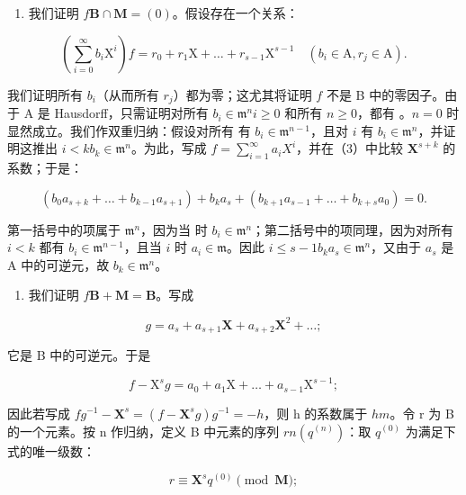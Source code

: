\begin{enumerate}
\def\labelenumi{(\alph{enumi})}
\tightlist
\item
  我们证明 \(f\mathbf{B} \cap \mathbf{M} = (0)\)。假设存在一个关系：
\end{enumerate}

\[
\left(\sum_ {i = 0} ^ {\infty} b _ {i} \mathrm{X} ^ {i}\right) f = r _ {0} + r _ {1} \mathrm{X} + \dots + r _ {s - 1} \mathrm{X} ^ {s - 1} \quad (b _ {i} \in \mathrm{A}, r _ {j} \in \mathrm{A}).\tag{3}
\]

我们证明所有 \(b_{i}\)（从而所有 \(r_{j}\)）都为零；这尤其将证明 \(f\) 不是 B 中的零因子。由于 A 是 Hausdorff，只需证明对所有 \(b_{i} \in \mathfrak{m}^{n}\)\(i \geqslant 0\) 和所有 \(n \geqslant 0\)，都有 。\(n = 0\) 时显然成立。我们作双重归纳：假设对所有  有 \(b_{i} \in \mathfrak{m}^{n-1}\)，且对 \(i\) 有 \(b_{i} \in \mathfrak{m}^{n}\)，并证明这推出 \(i < k\)\(b_{k} \in \mathfrak{m}^{n}\)。为此，写成 \(f = \sum_{i=1}^{\infty} a_{i} X^{i}\)，并在（3）中比较 \(\mathbf{X}^{s+k}\) 的系数；于是：

\[
\left(b _ {0} a _ {s + k} + \dots + b _ {k - 1} a _ {s + 1}\right) + b _ {k} a _ {s} + \left(b _ {k + 1} a _ {s - 1} + \dots + b _ {k + s} a _ {0}\right) = 0.\tag{4}
\]

第一括号中的项属于 \(\mathfrak{m}^n\)，因为当  时 \(b_i \in \mathfrak{m}^n\)；第二括号中的项同理，因为对所有 \(i < k\) 都有 \(b_i \in \mathfrak{m}^{n-1}\)，且当 \(i\) 时 \(a_i \in \mathfrak{m}\)。因此 \(i \leqslant s - 1\)\(b_k a_s \in \mathfrak{m}^n\)，又由于 \(a_s\) 是 A 中的可逆元，故 \(b_k \in \mathfrak{m}^n\)。

\begin{enumerate}
\def\labelenumi{(\alph{enumi})}
\setcounter{enumi}{1}
\tightlist
\item
  我们证明 \(f\mathbf{B} + \mathbf{M} = \mathbf{B}\)。写成
\end{enumerate}

\[
g = a _ {s} + a _ {s + 1} \mathbf {X} + a _ {s + 2} \mathbf {X} ^ {2} + \dots ;
\]

它是 B 中的可逆元。于是

\[
f - \mathrm{X} ^ {s} g = a _ {0} + a _ {1} \mathrm{X} + \dots + a _ {s - 1} \mathrm{X} ^ {s - 1};
\]

因此若写成 \(fg^{-1} - \mathbf{X}^s = (f - \mathbf{X}^s g)g^{-1} = -h\)，则 h 的系数属于 \(h\)\(m\)。令 r 为 B 的一个元素。按 n 作归纳，定义 B 中元素的序列 \(r\)\(n\)\((q^{(n)})\)：取 \(q^{(0)}\) 为满足下式的唯一级数：

\[
r \equiv \mathbf {X} ^ {s} q ^ {(0)} \pmod {\mathbf {M}};\tag{5}
\]

